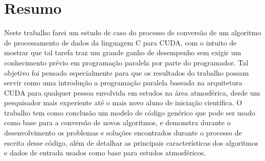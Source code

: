 \chapter*{Resumo}

Neste trabalho farei um estudo de caso do processo de conversão de um algoritmo de processamento de dados da linguagem C para CUDA, com o intuito de mostrar que tal tarefa traz um grande ganho de desempenho sem exigir um conhecimento prévio em programação paralela por parte do programador. Tal objetivo foi pensado especialmente para que os resultados do trabalho possam servir como uma introdução a programação paralela baseada na arquitetura CUDA para qualquer pessoa envolvida em estudos na área atmosférica, desde um pesquisador mais experiente até o mais novo aluno de iniciação científica. O trabalho tem como conclusão um modelo de código genérico que pode ser usado como base para a conversão de novos algoritmos, e demonstra durante o desenvolvimento os problemas e soluções encontrados durante o processo de escrita desse código, além de detalhar as principais características dos algoritmos e dados de entrada usados como base para estudos atmosféricos.